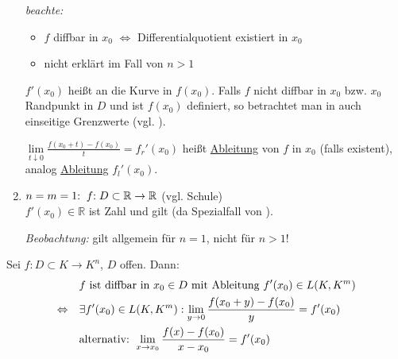 \begin{enumerate}[label={\arabic*)},leftmargin=\widthof{1)\ },topsep=-5pt]
	\emph{beachte:} \begin{itemize}
		\item $f$ \gls{diffbar} in $x_0$ $\Leftrightarrow$ Differentialquotient existiert in $x_0$
		\item {} nicht erklärt im Fall von $n>1$
	\end{itemize}

	\begin{interpretation}[ für $m > 1$]
		$f'(x_0)$ heißt  an die Kurve in $f(x_0)$. Falls $f$ nicht \gls{diffbar} in $x_0$ bzw. $x_0$ Randpunkt in $D$ und ist $f(x_0)$ definiert, so betrachtet man in  auch einseitige Grenzwerte (vgl. ).
		
		$\lim\limits_{t\downarrow 0} \frac{f(x_0 + t) - f(x_0)}{t} = f_r'(x_0)$ heißt  \uline{Ableitung} von $f$ in $x_0$ (falls existent), analog  \uline{Ableitung} $f_l'(x_0)$.
	\end{interpretation}

	\item \uline{$n=m=1\negthickspace:\;f\negthickspace: D\subset \mathbb{R}\to \mathbb{R}$} (vgl. Schule)\\[0.6ex]
	$f'(x_0)\in \mathbb{R}$ ist Zahl und  gilt (da Spezialfall von ).
	
	\emph{Beobachtung:}  gilt allgemein für $n=1$, nicht für $n>1$!
\end{enumerate}
\vspace*{1.5
	em}

\begin{conclusion}
	Sei $f:D\subset K\to K^n$, $D$ offen. Dann:
	\begin{align}
		\notag& \text{$f$ ist diffbar in $x_0\in D$ mit Ableitung $f'(x_0)\in L(K, K^m)$} \\
		\Leftrightarrow\quad
		& \exists f'(x_0) \in L(K, K^m): \lim\limits_{y\to 0} \frac{f(x_0 + y) - f(x_0)}{y} = f'(x_0) \\
		\notag 
		& \text{alternativ: } \lim\limits_{x\to x_0} \frac{f(x) - f(x_0)}{x - x_0} = f'(x_0)
	\end{align}
\end{conclusion}

